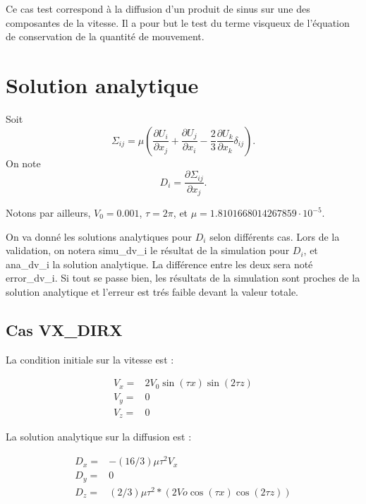 Ce cas test correspond \`a la diffusion d'un produit de sinus sur une des composantes de la vitesse. Il a pour but le test du terme visqueux de l'\'equation de conservation de la quantit\'e de mouvement.

\section{Solution analytique}

Soit
\begin{equation}
\varSigma_{ij} = \mu \left(\frac{\partial U_i}{\partial x_j} + \frac{\partial U_j}{\partial x_i} -\frac{2}{3} \frac{\partial U_k}{\partial x_k} \delta_{ij}\right).
\end{equation}
On note
\begin{equation}
D_i = \frac{\partial \varSigma_{ij}}{\partial x_j}.
\end{equation}

Notons par ailleurs, $V_0 = 0.001$, $\tau=2\pi$, et $\mu=1.8101668014267859\cdot 10^{-5}$.

On va donn\'e les solutions analytiques pour $D_i$ selon diff\'erents cas.
Lors de la validation, on notera {\textsf simu\_dv\_i} le r\'esultat de la
simulation pour $D_i$, et {\textsf ana\_dv\_i} la solution analytique.
La diff\'erence entre les deux sera not\'e \textsf{error\_dv\_i}. Si tout se passe bien, les r\'esultats de la simulation sont proches de la solution analytique et l'erreur est tr\'es faible devant la valeur totale.



\subsection{Cas VX\_DIRX}

La condition initiale sur la vitesse est :

\begin{align*}
V_x ={}& 2 V_0 \sin(\tau x) \sin(2 \tau z) \\
V_y ={}& 0 \\
V_z ={}& 0
\end{align*}

La solution analytique sur la diffusion est :

\begin{align*}
D_x ={}& -(16/3) \mu \tau^2 V_x \\
D_y ={}& 0 \\
D_z ={}& (2/3) \mu \tau^2 * (2Vo \cos(\tau x) \cos(2 \tau z))
\end{align*}

